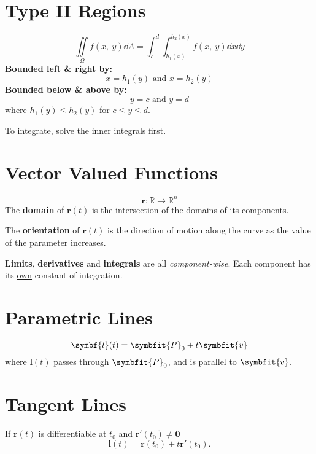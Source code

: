\documentclass{article}
\begin{document}
\begin{multicols}{3}
    \section*{Type II Regions}
    \begin{equation*}
        \iint\limits_{\Omega} f(x,\: y) \dd{A} = \int_c^d\int_{h_1(x)}^{h_2(x)} f(x,\: y) \dd{x} \dd{y}
    \end{equation*}
    \textbf{Bounded left \& right by:}
    \begin{equation*}
        x=h_1(y) \text{ and } x=h_2(y)
    \end{equation*}
    \textbf{Bounded below \& above by:}
    \begin{equation*}
        y=c \text{ and } y=d
    \end{equation*}
    where \(h_1(y) \leq h_2(y)\) for \(c \leq y \leq d\).

    To integrate, solve the inner integrals first.
    \section*{Vector Valued Functions}
    \begin{equation*}
        \symbf{r}:\mathbb{R} \to \mathbb{R}^n
    \end{equation*}
    The \textbf{domain} of \(\symbf{r}(t)\) is the intersection of the domains
    of its components.

    The \textbf{orientation} of \(\symbf{r}(t)\) is the direction of motion along the
    curve as the value of the parameter increases.

    \textbf{Limits}, \textbf{derivatives} and \textbf{integrals} are all \textit{component-wise}. Each component has its \underline{own} constant of integration.
    \section*{Parametric Lines}
    \begin{equation*}
        \symbf{l}(t) = \symbfit{P}_0 + t\symbfit{v}
    \end{equation*}
    where \(\symbf{l}(t)\) passes through \(\symbfit{P}_0\), and is parallel to \(\symbfit{v}\).
    \section*{Tangent Lines}
    If \(\symbf{r}(t)\) is differentiable at
    \(t_0\) and \(\symbf{r'}(t_0)\ne\symbf{0}\)
    \begin{equation*}
        \symbf{l}(t) = \symbf{r}(t_0)+t\symbf{r'}(t_0).
    \end{equation*}

\end{multicols}
\end{document}
